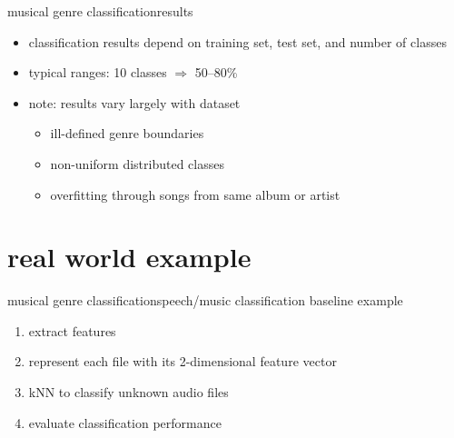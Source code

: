         \begin{frame}{musical genre classification}{results}
            \begin{itemize}
                \item	classification results depend on training set, test set, and number of classes
                \item<2->	typical ranges: 10 classes $\Rightarrow$ 50--80\%
                \item<3->	note: results vary largely with dataset
                    \begin{itemize}
                        \item   ill-defined genre boundaries
                        \item   non-uniform distributed classes
                        \item   overfitting through songs from same album or artist
                    \end{itemize}
            \end{itemize}
        \end{frame}
    \section[example]{real world example}
        \begin{frame}{musical genre classification}{speech/music classification baseline example}
            \begin{enumerate}
                \item	extract features
                \smallskip
                \item   represent each file with its 2-dimensional feature vector
                \smallskip
                \item   kNN to classify unknown audio files
                \smallskip
                \item   evaluate classification performance
            \end{enumerate}
        \end{frame}

